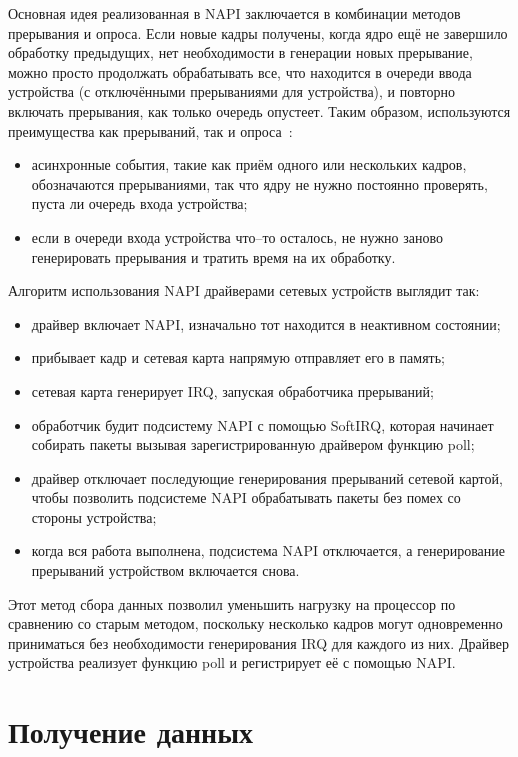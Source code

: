 Основная идея реализованная в NAPI заключается в комбинации методов прерывания и опроса. Если новые кадры получены, когда ядро ещё не завершило обработку предыдущих, нет необходимости в генерации новых прерывание, можно просто продолжать обрабатывать все, что находится в очереди ввода устройства (с отключёнными прерываниями для устройства), и повторно включать прерывания, как только очередь опустеет. Таким образом,  используются преимущества как прерываний, так и опроса~\cite{net}:
\begin{itemize}[label=---]
	\item асинхронные события, такие как приём одного или нескольких кадров, обозначаются прерываниями, так что ядру не нужно постоянно проверять, пуста ли очередь входа устройства;
	\item если в очереди входа устройства что--то осталось, не нужно заново генерировать прерывания и тратить время на их обработку.
\end{itemize}

Алгоритм использования NAPI драйверами сетевых устройств выглядит так:
\begin{itemize}[label=---]
	\item драйвер включает NAPI, изначально тот находится в неактивном состоянии;
	\item прибывает кадр и сетевая карта напрямую отправляет его в память;
	\item сетевая карта генерирует IRQ, запуская обработчика прерываний;
	\item обработчик будит подсистему NAPI с помощью SoftIRQ, которая начинает собирать пакеты вызывая зарегистрированную драйвером функцию poll;
	\item драйвер отключает последующие генерирования прерываний сетевой картой, чтобы позволить подсистеме NAPI обрабатывать пакеты без помех со стороны устройства;
	\item когда вся работа выполнена, подсистема NAPI отключается, а генерирование прерываний устройством включается снова.
\end{itemize}

Этот метод сбора данных позволил уменьшить нагрузку на процессор по сравнению со старым методом, поскольку несколько кадров могут одновременно приниматься без необходимости генерирования IRQ для каждого из них. Драйвер устройства реализует функцию poll и регистрирует её с помощью NAPI.

\section{Получение данных}

